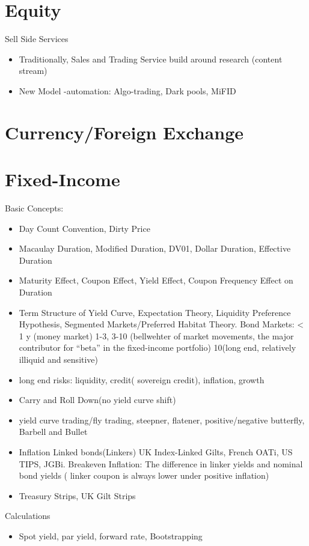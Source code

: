 \documentclass[11pt, openany]{book}              %
\begin{document}
\section{Equity}
Sell Side Services
\begin{itemize}
    \item Traditionally, Sales and Trading Service build around research (content stream)
    \item New Model -automation: Algo-trading, Dark pools, MiFID
\end{itemize}
\section{Currency/Foreign Exchange}
\section{Fixed-Income}
Basic Concepts:
\begin{itemize}
    \item Day Count Convention, Dirty Price
    \item Macaulay Duration, Modified Duration, DV01, Dollar Duration, Effective Duration
    \item Maturity Effect, Coupon Effect, Yield Effect, Coupon Frequency Effect on Duration
    \item Term Structure of Yield Curve, Expectation Theory, Liquidity Preference Hypothesis, Segmented Markets/Preferred Habitat Theory. Bond Markets: < 1 y (money market) 1-3, 3-10 (bellwehter of market movements, the major contributor for “beta” in the fixed-income portfolio) 10(long end, relatively illiquid and sensitive) 
    \item long end risks: liquidity, credit( sovereign credit), inflation, growth
    \item Carry and Roll Down(no yield curve shift)
    \item yield curve trading/fly trading, steepner, flatener, positive/negative butterfly, Barbell and Bullet
    \item Inflation Linked bonds(Linkers) UK Index-Linked Gilts, French OATi, US TIPS, JGBi. Breakeven Inflation: The difference in linker yields and nominal bond yields ( linker coupon is always lower under positive inflation) 
    \item Treasury Strips, UK Gilt Strips 
\end{itemize}

Calculations
\begin{itemize}
    \item Spot yield, par yield, forward rate, Bootstrapping
\end{itemize}
\end{document}
